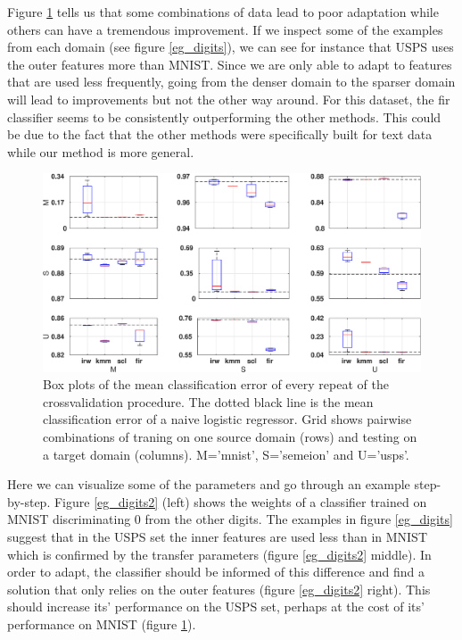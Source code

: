 \documentclass[twoside,11pt]{article}
\begin{document}
Figure \ref{err_digits} tells us that some combinations of data lead to poor adaptation while others can have a tremendous improvement. If we inspect some of the examples from each domain (see figure \ref{eg_digits}), we can see for instance that USPS uses the outer features more than MNIST. Since we are only able to adapt to features that are used less frequently, going from the denser domain to the sparser domain will lead to improvements but not the other way around. For this dataset, the {\sc fir} classifier seems to be consistently outperforming the other methods. This could be due to the fact that the other methods were specifically built for text data while our method is more general.

\begin{figure}[ht]
	\centering
	\includegraphics[width=.9\textwidth]{images/err_digits_box.eps}
	\caption{Box plots of the mean classification error of every repeat of the crossvalidation procedure. The dotted black line is the mean classification error of a naive logistic regressor. Grid shows pairwise combinations of traning on one source domain (rows) and testing on a target domain (columns). M='mnist', S='semeion' and U='usps'.}
	\label{err_digits}
\end{figure}

Here we can visualize some of the parameters and go through an example step-by-step. Figure \ref{eg_digits2} (left) shows the weights of a classifier trained on MNIST discriminating $0$ from the other digits. The examples in figure \ref{eg_digits} suggest that in the USPS set the inner features are used less than in MNIST which is confirmed by the transfer parameters (figure \ref{eg_digits2} middle). In order to adapt, the classifier should be informed of this difference and find a solution that only relies on the outer features (figure \ref{eg_digits2} right). This should increase its' performance on the USPS set, perhaps at the cost of its' performance on MNIST (figure \ref{err_digits}).
\end{document}
